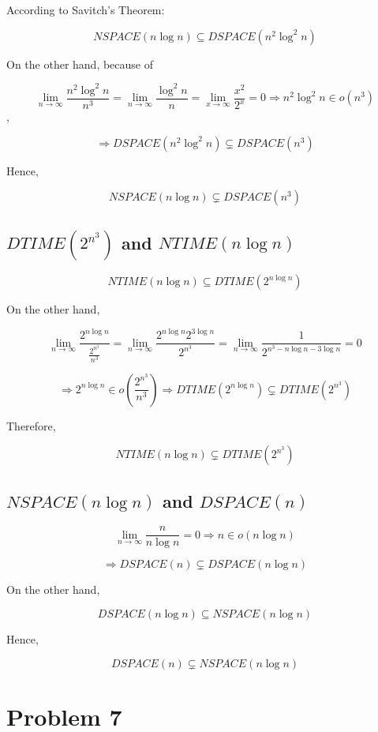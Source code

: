 \documentclass{article}
\begin{document}
According to Savitch's Theorem:

\[NSPACE(n\log n) \subseteq DSPACE(n^2\log^2 n)\]

On the other hand, because of

\[\lim_{n\to\infty} \frac{n^2\log^2 n}{n^3} = \lim_{n\to\infty} \frac{\log^2 n}{n} = \lim_{x\to\infty} \frac{x^2}{2^x} = 0 \Rightarrow n^2\log^2 n \in o(n^3)\],

\[\Rightarrow DSPACE(n^2\log^2 n) \subsetneq DSPACE(n^3)\]

Hence, 

\[NSPACE(n\log n) \subsetneq DSPACE(n^3)\]

\subsection{$DTIME(2^{n^3})$ and $NTIME(n\log n)$}

\[NTIME(n\log n) \subseteq DTIME(2^{n\log n})\]

On the other hand,

\[\lim_{n\to\infty} \frac{2^{n\log n}}{\frac{2^{n^3}}{n^3}} = \lim_{n\to\infty} \frac{2^{n\log n} 2^{3\log n}}{2^{n^3}} = \lim_{n\to\infty} \frac{1}{2^{n^3 - n\log n - 3\log n}} = 0\]

\[\Rightarrow 2^{n\log n} \in o\left (\frac{2^{n^3}}{n^3}\right ) \Rightarrow DTIME(2^{n\log n}) \subsetneq DTIME(2^{n^3})\]

Therefore,

\[NTIME(n\log n) \subsetneq DTIME(2^{n^3})\]

\subsection{$NSPACE(n\log n)$ and $DSPACE(n)$}

\[\lim_{n\to\infty} \frac{n}{n\log n} = 0 \Rightarrow n \in o(n\log n)\]

\[\Rightarrow DSPACE(n) \subsetneq DSPACE(n\log n)\]

On the other hand,

\[DSPACE(n\log n) \subseteq NSPACE(n\log n)\]

Hence,

\[DSPACE(n) \subsetneq NSPACE(n\log n)\]

\section{Problem 7}
\end{document}
